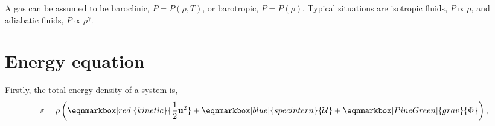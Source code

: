 A gas can be assumed to be \textsf{baroclinic}, $P = P(\rho, T)$, or \textsf{barotropic}, $P = P(\rho)$. Typical situations are \textsf{isotropic fluids}, $P\propto\rho$, and \textsf{adiabatic fluids}, $P\propto\rho^\gamma$. 
\section{Energy equation} 
Firstly, the total energy density of a system is, 
\begin{equation}
  \varepsilon = \rho\left(\eqnmarkbox[red]{kinetic}{\frac{1}{2}\mathbf{u}^2} + \eqnmarkbox[blue]{specintern}{\mathcal{U}}+\eqnmarkbox[PineGreen]{grav}{\Phi}\right),
\end{equation}
\\

